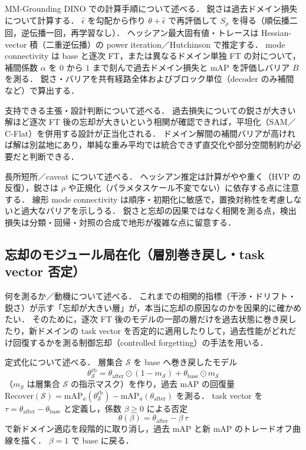 MM-Grounding DINO での計算手順について述べる．
鋭さは過去ドメイン損失について計算する．
$\hat{\epsilon}$ を勾配から作り $\theta + \hat{\epsilon}$ で再評価して $S_\rho$ を得る（順伝播二回，逆伝播一回，再学習なし）．
ヘッシアン最大固有値・トレースは Hessian-vector 積（二重逆伝播）の power iteration／Hutchinson で推定する．
mode connectivity は base と逐次 FT，または異なるドメイン単独 FT の対について，補間係数 $\alpha$ を $0$ から $1$ まで刻んで過去ドメイン損失と mAP を評価しバリア $B$ を測る．
鋭さ・バリアを共有経路全体およびブロック単位（decoder のみ補間など）で算出する．

支持できる主張・設計判断について述べる．
過去損失についての鋭さが大きい解ほど逐次 FT 後の忘却が大きいという相関が確認できれば，平坦化（SAM／C-Flat）を併用する設計が正当化される．
ドメイン解間の補間バリアが高ければ解は別盆地にあり，単純な重み平均では統合できず直交化や部分空間制約が必要だと判断できる．

長所短所／caveat について述べる．
ヘッシアン推定は計算がやや重く（HVP の反復），鋭さは $\rho$ や正規化（パラメタスケール不変でない）に依存する点に注意する．
線形 mode connectivity は順序・初期化に敏感で，置換対称性を考慮しないと過大なバリアを示しうる．
鋭さと忘却の因果ではなく相関を測る点，検出損失は分類・回帰・対照の合成で地形が複雑な点に留意する．


\subsection{忘却のモジュール局在化（層別巻き戻し・task vector 否定）}
\label{subsec:localization}

何を測るか／動機について述べる．
これまでの相関的指標（干渉・ドリフト・鋭さ）が示す「忘却が大きい層」が，本当に忘却の原因なのかを因果的に確かめたい．
そのために，逐次 FT 後のモデルの一部の層だけを過去状態に巻き戻したり，新ドメインの task vector を否定的に適用したりして，過去性能がどれだけ回復するかを測る制御忘却（controlled forgetting）の手法を用いる．

定式化について述べる．
層集合 $\mathcal{S}$ を base へ巻き戻したモデル
\begin{equation}
\theta^{\mathrm{rb}}_{\mathcal{S}} = \theta_{\mathrm{after}} \odot (1 - m_{\mathcal{S}}) + \theta_{\mathrm{base}} \odot m_{\mathcal{S}}
\end{equation}
（$m_{\mathcal{S}}$ は層集合 $\mathcal{S}$ の指示マスク）を作り，過去 mAP の回復量 $\mathrm{Recover}(\mathcal{S}) = \mathrm{mAP}_a(\theta^{\mathrm{rb}}_{\mathcal{S}}) - \mathrm{mAP}_a(\theta_{\mathrm{after}})$ を測る．
task vector \cite{taskarith} を $\tau = \theta_{\mathrm{after}} - \theta_{\mathrm{base}}$ と定義し，係数 $\beta \geq 0$ による否定
\begin{equation}
\theta(\beta) = \theta_{\mathrm{after}} - \beta\, \tau
\end{equation}
で新ドメイン適応を段階的に取り消し，過去 mAP と新 mAP のトレードオフ曲線を描く．
$\beta = 1$ で base に戻る．


